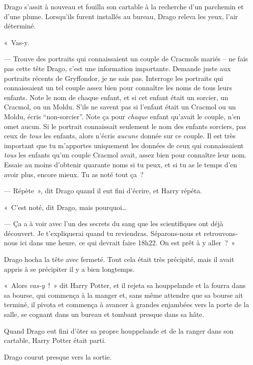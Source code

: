 Drago s'assit à nouveau et fouilla son cartable à la recherche d'un parchemin et d'une plume. Lorsqu'ils furent installés au bureau, Drago releva les yeux, l'air déterminé.

«~Vas-y.

--- Trouve des portraits qui connaissaient un couple de Cracmols mariés -- ne fais pas cette tête Drago, c'est une information importante. Demande juste aux portraits récents de Gryffondor, je ne sais pas. Interroge les portraits qui connaissaient un tel couple assez bien pour connaître les noms de tous leurs enfants. Note le nom de chaque enfant, et si cet enfant était un sorcier, un Cracmol, ou un Moldu. S'ils ne savent pas si l'enfant était un Cracmol ou un Moldu, écris “non-sorcier”. Note ça pour \emph{chaque} enfant qu'avait le couple, n'en omet aucun. Si le portrait connaissait seulement le nom des enfants sorciers, pas ceux de \emph{tous} les enfants, alors n'écris \emph{aucune} donnée sur ce couple. Il est très important que tu m'apportes uniquement les données de ceux qui connaissaient \emph{tous} les enfants qu'un couple Cracmol avait, assez bien pour connaître leur nom. Essaie au moins d'obtenir quarante noms si tu peux, et si tu as le temps d'en avoir plus, encore mieux. Tu as noté tout ça~?

--- Répète~», dit Drago quand il eut fini d'écrire, et Harry répéta.

«~C'est noté, dit Drago, mais pourquoi…

--- Ça a à voir avec l'un des secrets du sang que les scientifiques ont déjà découvert. Je t'expliquerai quand tu reviendras. Séparons-nous et retrouvons-nous ici dans une heure, ce qui devrait faire 18h22. On est prêt à y aller~?~»

Drago hocha la tête avec fermeté. Tout cela était très précipité, mais il avait appris à se précipiter il y a bien longtemps.

«~Alors \emph{vas-y}~!~» dit Harry Potter, et il rejeta sa houppelande et la fourra dans sa bourse, qui commença à la manger et, sans même attendre que sa bourse ait terminé, il pivota et commença à avancer à grandes enjambées vers la porte de la salle, se cognant dans un bureau et tombant presque dans sa hâte.

Quand Drago eut fini d'ôter sa propre houppelande et de la ranger dans son cartable, Harry Potter était parti.

Drago courut presque vers la sortie.~
